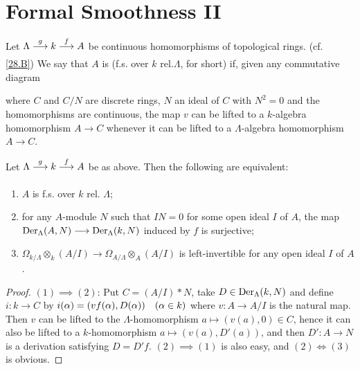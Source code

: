 \documentclass[../main]{subfiles}
\begin{document}
\section{Formal Smoothness II}\label{sec:30}
\begin{pardefinition}
Let $\Lambda \varrightarrow{g} k \varrightarrow{f} A$ be continuous homomorphisms of topological rings. (cf. \ref{28.B}) We say that $A$ is  (f.s. over $k$ rel.$\Lambda$, for short) if, given any commutative diagram 
\begin{center}
\end{center}
where $C$ and $C/N$ are discrete rings, $N$ an ideal of $C$ with $N^2 = 0$ and the homomorphisms are continuous, the map $v$ can be lifted to a $k$-algebra homomorphism $A \longrightarrow C$ whenever it can be lifted to a $\Lambda$-algebra homomorphism $A \longrightarrow C$.
\end{pardefinition}

\begin{theorem}
\label{thm:065}
Let $\Lambda \varrightarrow{g} k \varrightarrow{f} A$ be as above. Then the following are equivalent: 

\begin{enumerate}[label= (\arabic*)]
    \item $A$ is f.s. over $k$ rel. $\Lambda$;
    \item for any $A$-module $N$ such that $IN = 0$ for some open ideal $I$ of $A$, the map $\operatorname{Der}_\Lambda(A, N) \longrightarrow \operatorname{Der}_\Lambda(k, N)$ induced by $f$ is surjective; 
    \item $\Omega_{k/\Lambda} \otimes_k (A/I) \longrightarrow \Omega_{A/\Lambda} \otimes_A (A/I)$ is left-invertible for any open ideal $I$ of $A$. 
\end{enumerate}
\end{theorem}

\begin{proof}
$(1) \implies (2)$: Put $C = (A/I) \ast N$, take $D \in \operatorname{Der}_\Lambda(k, N)$ and define $i : k \longrightarrow C$ by $i(\alpha) = (v f(\alpha), D(\alpha))\for{\alpha \in k}$ where $v : A \longrightarrow A/I$ is the natural map. Then $v$ can be lifted to the $\Lambda$-homomorphism $a \mapsto (v(a), 0) \in C$, hence it can also be lifted to a $k$-homomorphism $a \mapsto (v(a), D'(a))$, and then $D' : A \longrightarrow N$ is a derivation satisfying $D = D'f$. $(2) \implies (1)$ is also easy, and $(2) \iff (3)$ is obvious.
\end{proof}
\end{document}
